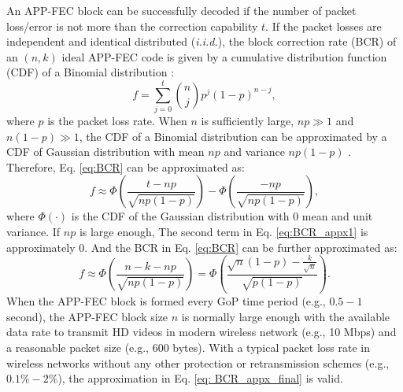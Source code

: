 \documentclass[journal]{IEEEtran}
\begin{document}
An APP-FEC block can be successfully decoded if the number of packet loss/error is not more than the correction capability $t$. If the packet losses are independent and identical distributed (\textit{i.i.d.}), the block correction rate (BCR) of an $\left(n,k\right)$ ideal APP-FEC code is given by a cumulative distribution function (CDF) of a Binomial distribution \cite{HHWL12}:
\begin{equation} \label{eq:BCR}
f=\sum_{j=0}^{t}\binom{n}{j}p^j\left(1-p\right)^{n-j},
\end{equation}
where $p$ is the packet loss rate. When $n$ is sufficiently large, $np\gg1$ and $n\left(1-p\right)\gg1$, the CDF of a Binomial distribution can be approximated by a CDF of Gaussian distribution with mean $np$ and variance $np\left(1-p\right)$ \cite{StWo11}. Therefore, Eq. \eqref{eq:BCR} can be approximated as:
\begin{equation} \label{eq:BCR_appx1}
f\approx \Phi\left(\frac{t-np}{\sqrt{np\left(1-p\right)}}\right)-\Phi\left(\frac{-np}{\sqrt{np\left(1-p\right)}}\right),
\end{equation}
where $\Phi\left(\cdot\right)$ is the CDF of the Gaussian distribution with $0$ mean and unit variance. If $np$ is large enough, The second term in Eq. \eqref{eq:BCR_appx1} is approximately $0$. And the BCR in Eq. \eqref{eq:BCR} can be further approximated as:
\begin{equation}\label{eq: BCR_appx_final}
f\approx \Phi\left(\frac{n-k-np}{\sqrt{np\left(1-p\right)}}\right)=\Phi\left(\frac{\sqrt{n}\left(1-p\right)-\frac{k}{\sqrt{n}}}{\sqrt{p\left(1-p\right)}}\right).
\end{equation}
When the APP-FEC block is formed every GoP time period (e.g., $0.5 - 1$ second), the APP-FEC block size $n$ is normally large enough with the available data rate to transmit HD videos in modern wireless network (e.g., 10 Mbps) and a reasonable packet size (e.g., $600$ bytes). With a typical packet loss rate in wireless networks without any other protection or retransmission schemes (e.g., $0.1 \% - 2 \%$), the approximation in Eq. \eqref{eq: BCR_appx_final} is valid.
\end{document}
